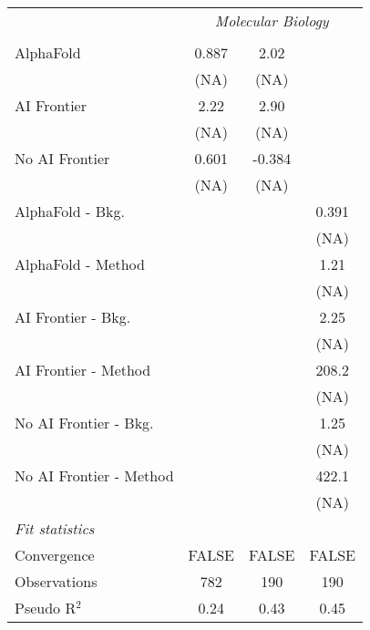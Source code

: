 \begin{tabular}{lccc}
 & \multicolumn{3}{c}{\textit{Molecular Biology}} \\ \\
   AlphaFold               & 0.887 & 2.02   &   \\   
                           & (NA)  & (NA)   &   \\   
   AI Frontier             & 2.22  & 2.90   &   \\   
                           & (NA)  & (NA)   &   \\   
   No AI Frontier          & 0.601 & -0.384 &   \\   
                           & (NA)  & (NA)   &   \\   
   AlphaFold - Bkg.        &       &        & 0.391\\   
                           &       &        & (NA)\\   
   AlphaFold - Method      &       &        & 1.21\\   
                           &       &        & (NA)\\   
   AI Frontier - Bkg.      &       &        & 2.25\\   
                           &       &        & (NA)\\   
   AI Frontier - Method    &       &        & 208.2\\   
                           &       &        & (NA)\\   
   No AI Frontier - Bkg.   &       &        & 1.25\\   
                           &       &        & (NA)\\   
   No AI Frontier - Method &       &        & 422.1\\   
                           &       &        & (NA)\\   
   \midrule
   \emph{Fit statistics}\\
   Convergence             &FALSE  & FALSE  & FALSE\\  
   Observations            & 782   & 190    & 190\\  
   Pseudo R$^2$            & 0.24  & 0.43   & 0.45\\  
   

\end{tabular}
